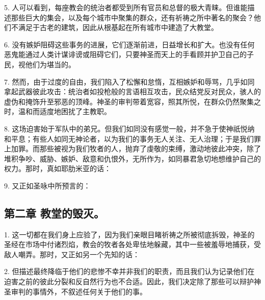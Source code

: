 5. 人可以看到，每座教会的统治者都受到所有官员和总督的极大青睐。但谁能描述那些巨大的集会，以及每个城市中聚集的群众，还有祈祷之所中著名的聚会？他们不满足于古老的建筑，因此从根基起在所有城市中建造了大教堂。\par

6. 没有嫉妒阻碍这些事务的进展，它们逐渐前进，日益增长和扩大。也没有任何恶鬼能通过人类计谋诽谤或阻碍它们，只要神圣而天上的手看顾并护卫自己的子民，视他们为堪当的。\par

7. 然而，由于过度的自由，我们陷入了松懈和怠惰，互相嫉妒和辱骂，几乎如同拿起武器彼此攻击：统治者如投枪般的言语相互攻击，民众结党反对民众，骇人的虚伪和掩饰升至邪恶的顶峰。神圣的审判带着宽容，照其所悦，在群众仍然聚集之时，温和而适度地困扰了主教职。\par

8. 这场迫害始于军队中的弟兄。但我们如同没有感觉一般，并不急于使神祇悦纳和平息；有些人如同无神论者，以为我们的事务无人关注、无人治理；于是我们罪上加罪。而那些被视为我们牧者的人，抛弃了虔敬的束缚，激动地彼此冲突，除了堆积争吵、威胁、嫉妒、敌意和仇恨外，无所作为，如同暴君急切地想维护自己的权力。那时，真如耶肋米亚的话： \par

9. 又正如圣咏中所预言的：\par


\subsection{第二章 教堂的毁灭。}

1. 这一切都在我们身上应验了，因为我们亲眼目睹祈祷之所被彻底拆毁，神圣的圣经在市场中付诸烈焰，教会的牧者各处卑怯地躲藏，其中一些被羞辱地捕获，受敌人嘲弄。那时，又正如另一个先知的话：\par

2. 但描述最终降临于他们的悲惨不幸并非我们的职责，而且我们认为记录他们在迫害之前的彼此分裂和反自然行为也不合适。因此，我们决定除了那些可以辩护神圣审判的事情外，不叙述任何关于他们的事。\par

